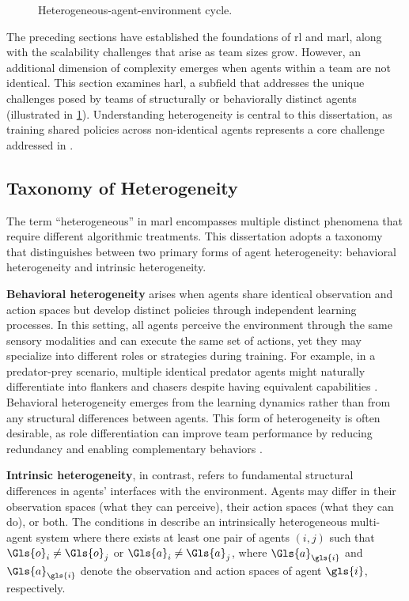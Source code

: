 \begin{figure}
    \centering
    
    \caption{Heterogeneous-agent-environment cycle.}
    \label{fig:hae_cycle}
\end{figure}

The preceding sections have established the foundations of \gls{rl} and \gls{marl}, 
along with the scalability challenges that arise as team sizes grow. However, 
an additional dimension of complexity emerges when agents within a team are not identical. 
This section examines \gls{harl}, a subfield that addresses the unique challenges 
posed by teams of structurally or behaviorally distinct agents (illustrated in 
\cref{fig:hae_cycle}). Understanding heterogeneity is central to this dissertation, 
as training shared policies across non-identical agents represents 
a core challenge addressed in .

\subsection{Taxonomy of Heterogeneity}
\label{subsec:taxonomy-heterogeneity}

The term ``heterogeneous'' in \gls{marl} encompasses multiple distinct 
phenomena that require different algorithmic treatments. 
This dissertation adopts a taxonomy that distinguishes between two primary forms 
of agent heterogeneity: behavioral heterogeneity and intrinsic heterogeneity.

\textbf{Behavioral heterogeneity} arises when agents share identical observation 
and action spaces but develop distinct policies through independent learning processes. 
In this setting, all agents perceive the environment through the same sensory 
modalities and can execute the same set of actions, yet they may specialize 
into different roles or strategies during training. For example, in a predator-prey 
scenario, multiple identical predator agents might naturally differentiate into 
flankers and chasers despite having equivalent capabilities \cite{calvo2018}. 
Behavioral heterogeneity emerges from the learning dynamics rather than from 
any structural differences between agents. This form of heterogeneity is often 
desirable, as role differentiation can improve team performance by reducing 
redundancy and enabling complementary behaviors \cite{wakilpoor2020}.

\textbf{Intrinsic heterogeneity}, in contrast, refers to fundamental 
structural differences in agents' interfaces with the environment. 
Agents may differ in their observation spaces (what they can perceive), 
their action spaces (what they can do), or both. The conditions in 
\cite{zhong2024} describe an intrinsically heterogeneous multi-agent 
system where there exists at least one pair of agents \((i, j)\)
such that \(\Gls{o}_i \neq \Gls{o}_j\) or \(\Gls{a}_i \neq \Gls{a}_j\), 
where \(\Gls{a}_{\gls{i}}\) and \(\Gls{a}_{\gls{i}}\) denote the 
observation and action spaces of agent \(\gls{i}\), respectively.


